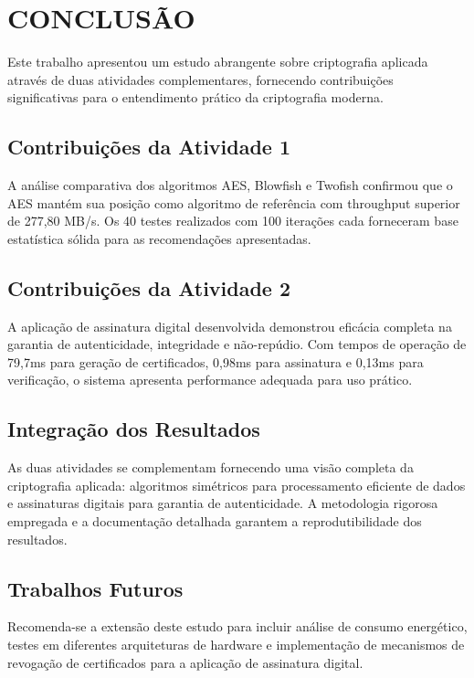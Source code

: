 \documentclass[12pt,a4paper,oneside]{article}
\begin{document}
\section{CONCLUSÃO}

Este trabalho apresentou um estudo abrangente sobre criptografia aplicada através de duas atividades complementares, fornecendo contribuições significativas para o entendimento prático da criptografia moderna.

\subsection{Contribuições da Atividade 1}

A análise comparativa dos algoritmos AES, Blowfish e Twofish confirmou que o AES mantém sua posição como algoritmo de referência com throughput superior de 277,80 MB/s. Os 40 testes realizados com 100 iterações cada forneceram base estatística sólida para as recomendações apresentadas.

\subsection{Contribuições da Atividade 2}

A aplicação de assinatura digital desenvolvida demonstrou eficácia completa na garantia de autenticidade, integridade e não-repúdio. Com tempos de operação de 79,7ms para geração de certificados, 0,98ms para assinatura e 0,13ms para verificação, o sistema apresenta performance adequada para uso prático.

\subsection{Integração dos Resultados}

As duas atividades se complementam fornecendo uma visão completa da criptografia aplicada: algoritmos simétricos para processamento eficiente de dados e assinaturas digitais para garantia de autenticidade. A metodologia rigorosa empregada e a documentação detalhada garantem a reprodutibilidade dos resultados.

\subsection{Trabalhos Futuros}

Recomenda-se a extensão deste estudo para incluir análise de consumo energético, testes em diferentes arquiteturas de hardware e implementação de mecanismos de revogação de certificados para a aplicação de assinatura digital.
\end{document}

